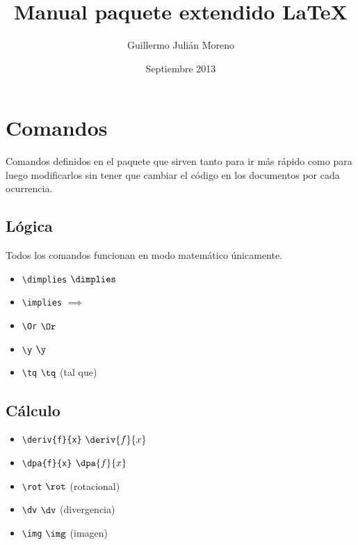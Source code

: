 \documentclass{apuntes}
\author{Guillermo Julián Moreno}
\date{Septiembre 2013}
\title{Manual paquete extendido \LaTeX}
\begin{document}
\pagestyle{plain}
\maketitle

\section{Comandos}

Comandos definidos en el paquete que sirven tanto para ir más rápido como para luego modificarlos sin tener que cambiar el código en los documentos por cada ocurrencia.

\subsection{Lógica}
Todos los comandos funcionan en modo matemático únicamente.
\begin{itemize}
\item \verb|\dimplies| $\dimplies$
\item \verb|\implies| $\implies$
\item \verb|\Or| $\Or$
\item \verb|\y| $\y$
\item \verb|\tq| $\tq$ (tal que)
\end{itemize}

\subsection{Cálculo}

\begin{itemize}
\item \verb|\deriv{f}{x}| $\deriv{f}{x}$
\item \verb|\dpa{f}{x}| $\dpa{f}{x}$
\item \verb|\rot| $\rot$ (rotacional)
\item \verb|\dv| $\dv$ (divergencia)
\item \verb|\img| $\img$ (imagen)
\end{itemize}
\end{document}
